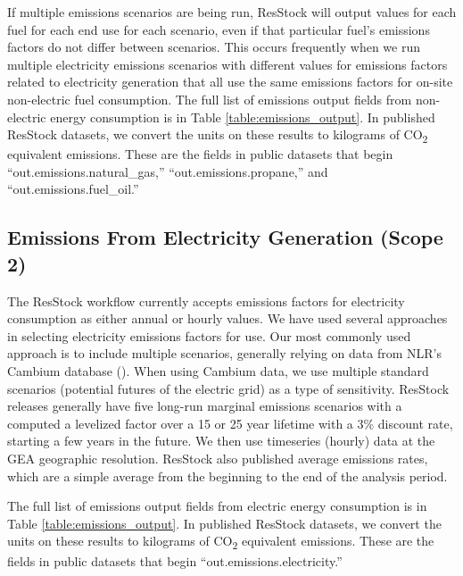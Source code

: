 If multiple emissions scenarios are being run, ResStock will output values for each fuel for each end use for each scenario, even if that particular fuel's emissions factors do not differ between scenarios. This occurs frequently when we run multiple electricity emissions scenarios with different values for emissions factors related to electricity generation that all use the same emissions factors for on-site non-electric fuel consumption. The full list of emissions output fields from non-electric energy consumption is in Table \ref{table:emissions_output}. In published ResStock datasets, we convert the units on these results to kilograms of CO\textsubscript{2} equivalent emissions. These are the fields in public datasets that begin ``out.emissions.natural\_gas,'' ``out.emissions.propane,'' and ``out.emissions.fuel\_oil.''

\subsection{Emissions From Electricity Generation (Scope 2)}
The ResStock workflow currently accepts emissions factors for electricity consumption as either annual or hourly values. We have used several approaches in selecting electricity emissions factors for use. Our most commonly used approach is to include multiple scenarios, generally relying on data from NLR's Cambium database (\cite{Gagnon2025}). When using Cambium data, we use multiple standard scenarios (potential futures of the electric grid) as a type of sensitivity. ResStock releases generally have five long-run marginal emissions scenarios with a computed a levelized factor over a 15 or 25 year lifetime with a 3\% discount rate, starting a few years in the future. We then use timeseries (hourly) data at the GEA geographic resolution. ResStock also published average emissions rates, which are a simple average from the beginning to the end of the analysis period.

The full list of emissions output fields from electric energy consumption is in Table \ref{table:emissions_output}. In published ResStock datasets, we convert the units on these results to kilograms of CO\textsubscript{2} equivalent emissions. These are the fields in public datasets that begin ``out.emissions.electricity.''

